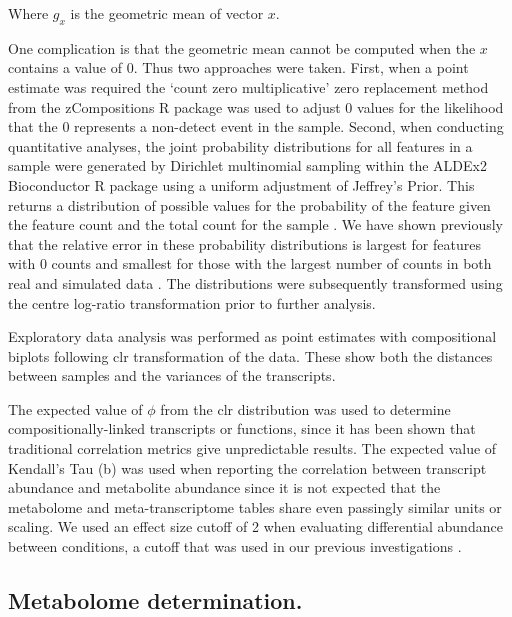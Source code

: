 \documentclass[10pt,letterpaper]{article}
\begin{document}
Where $g_x$ is the geometric mean of vector $x$.

One complication is that the geometric mean cannot be computed when the $x$ contains a value of 0. Thus two approaches were taken. First, when a point estimate was required  the `count zero multiplicative' zero replacement method from the zCompositions R package \cite{PalareaAlbaladejo201585} was used to adjust 0 values for the likelihood that the 0 represents a non-detect event in the sample. Second, when conducting quantitative analyses, the joint probability distributions for all features in a sample were generated by Dirichlet multinomial sampling within the ALDEx2 Bioconductor R package  \cite{fernandes:2013} using a uniform adjustment of Jeffrey's Prior. This returns a distribution of possible values for the probability of  the feature given the feature count and the total count for the sample \cite{fernandes:2013, gloorAJS:2016}. We have shown previously that the relative error in these probability distributions is largest for features with 0 counts and smallest for those with the largest number of counts in both real and simulated data \cite{fernandes:2013}. The distributions were subsequently transformed using the centre log-ratio transformation  prior to further analysis. 

Exploratory data analysis was performed as point estimates with compositional biplots \cite{aitchison2002biplots} following clr transformation of the data. These show both the distances between samples and the variances of the transcripts.

The expected value of $\phi$ \cite{Lovell:2015} from the clr distribution was used to determine compositionally-linked transcripts or functions, since it has been shown that traditional correlation metrics give unpredictable results\cite{pawlowsky2015modeling,pawlowsky2011compositional}. The expected value of Kendall's Tau (b) was used when reporting the correlation between transcript abundance and metabolite abundance since it is not expected that the metabolome and meta-transcriptome tables share even passingly similar units or scaling. We used an effect size cutoff of 2 when evaluating differential abundance between conditions, a cutoff that was used in our previous investigations \cite{macklaim:2013}. 

\subsection*{Metabolome determination.}
\end{document}
